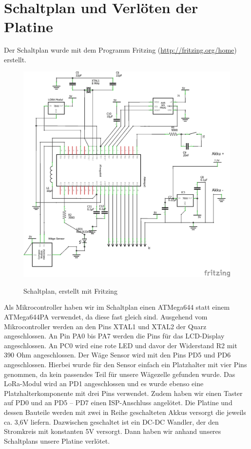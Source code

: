 \chapter{Schaltplan und Verlöten der Platine}
Der Schaltplan wurde mit dem Programm Fritzing (\url{http://fritzing.org/home}) erstellt.
\begin{figure}[ht]
    \center
    \includegraphics[width=15cm]{Bilder/schaltplan-1.png}\\
    \caption{Schaltplan, erstellt mit Fritzing}
    \label{fig:schaltplan}
\end{figure}
\newpage
Als Mikrocontroller haben wir im Schaltplan einen ATMega644 statt einem ATMega644PA verwendet, da diese fast gleich sind. Ausgehend vom Mikrocontroller werden an den Pins XTAL1 und XTAL2 der Quarz angeschlossen. An Pin PA0 bis PA7 werden die Pins für das LCD-Display angeschlossen. An PC0 wird eine rote LED und davor der Widerstand R2 mit 390 Ohm angeschlossen. Der Wäge Sensor wird mit den Pins PD5 und PD6 angeschlossen. Hierbei wurde für den Sensor einfach ein Platzhalter mit vier Pins genommen, da kein passendes Teil für unsere Wägezelle gefunden wurde. Das LoRa-Modul wird an PD1 angeschlossen und es wurde ebenso eine Platzhalterkomponente mit drei Pins verwendet. Zudem haben wir einen Taster auf PD0 und an PD5 – PD7 einen ISP-Anschluss angelötet. Die Platine und dessen Bauteile werden mit zwei in Reihe geschalteten Akkus versorgt die jeweils ca. 3,6V liefern. Dazwischen geschaltet ist ein DC-DC Wandler, der den Stromkreis mit konstanten 5V versorgt. Dann haben wir anhand unseres Schaltplans unsere Platine verlötet.\\

